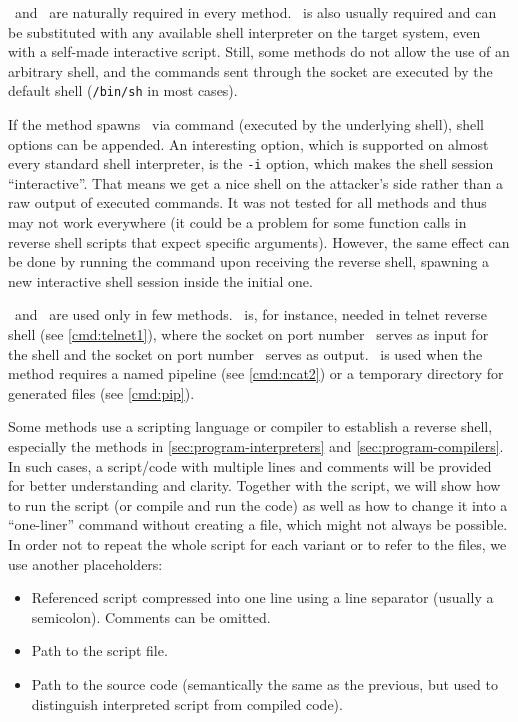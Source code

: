 \host\ and \port\ are naturally required in every method. \shell\ is also usually required and can be substituted with any available shell interpreter on the target system, even with a self-made interactive script. Still, some methods do not allow the use of an arbitrary shell, and the commands sent through the socket are executed by the default shell (\texttt{/bin/sh} in most cases).

If the method spawns \shell\ via command (executed by the underlying shell), shell options can be appended. An interesting option, which is supported on almost every standard shell interpreter, is the \texttt{-i} option, which makes the shell session ``interactive''. That means we get a nice shell on the attacker's side rather than a raw output of executed commands. It was not tested for all methods and thus may not work everywhere (it could be a problem for some function calls in reverse shell scripts that expect specific arguments). However, the same effect can be done by running the command  upon receiving the reverse shell, spawning a new interactive shell session inside the initial one.

\portt\ and \tmp\ are used only in few methods. \portt\ is, for instance, needed in telnet reverse shell (see \cref{cmd:telnet1}), where the socket on port number \port\ serves as input for the shell and the socket on port number \portt\ serves as output. \tmp\ is used when the method requires a named pipeline (see \cref{cmd:ncat2}) or a temporary directory for generated files (see \cref{cmd:pip}).

Some methods use a scripting language or compiler to establish a reverse shell, especially the methods in \cref{sec:program-interpreters} and \cref{sec:program-compilers}. In such cases, a script/code with multiple lines and comments will be provided for better understanding and clarity. Together with the script, we will show how to run the script (or compile and run the code) as well as how to change it into a ``one-liner'' command without creating a file, which might not always be possible. In order not to repeat the whole script for each variant or to refer to the files, we use another placeholders:

\setlength{\leftmargini}{10em}
\begin{itemize}
\item[\script] Referenced script compressed into one line using a line separator (usually a semicolon). Comments can be omitted.
\item[\scriptfile] Path to the script file.
\item[\codefile] Path to the source code (semantically the same as the previous, but used to distinguish interpreted script from compiled code).
\end{itemize}
\setlength{\leftmargini}{2.5em}

